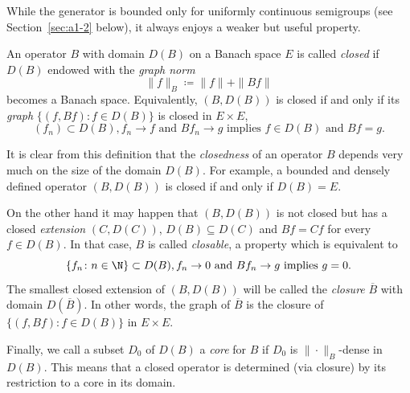 While the generator is bounded only for uniformly continuous semigroups (see Section~\ref{sec:a1-2} below), it always enjoys a weaker but useful property.
\begin{definition}\label{def:a1-1.8}
An operator $B$ with domain $D(B)$ on a Banach space $E$ is called \emph{closed} if\/ $D(B)$ endowed with the \emph{graph norm}
\begin{equation*}\label{eq:a1-1.8}
	\|f\|_{B} \coloneqq \|f\| + \|Bf\|
\end{equation*} 
becomes a Banach space.
Equivalently, $(B,D(B))$ is closed if and only if its \emph{graph} $\{(f,Bf) \colon f \in D(B)\}$ is closed in $E \times E$, \ie
\[
    (f_{n}) \subset D(B), f_{n} \to f \text{ and } Bf_{n} \to g \text{ implies } f \in D(B) \text{ and } Bf = g.
\]
\end{definition}
It is clear from this definition that the \emph{closedness} of an operator $B$ depends very much on the size of the domain $D(B)$.
For example, a bounded and densely defined operator $(B,D(B))$ is closed if and only if\/ $D(B) = E$.

On the other hand it may happen that $(B,D(B))$ is not closed but has a closed \emph{extension} $(C,D(C))$, \ie  $ D(B) \subseteq D(C)$ and $Bf = Cf $ for every $f \in D(B)$.
In that case, $B$ is called \emph{closable}, a property which is equivalent to
\[
    \{f_{n} \colon n \in \N \} \subset D(B), f_{n} \to 0 \text{ and } Bf_{n} \to g \text{ implies } g = 0.
\]
The smallest closed extension of\/ $(B,D(B))$ will be called the \emph{closure} $\overline{B}$ with domain $D(\overline{B})$.
In other words, the graph of\/ $\overline{B}$ is the closure of\/ $\{(f,Bf) \colon f \in D(B)\}$ in $E \times E$.

Finally, we call a subset $D_{0}$ of\/ $D(B)$ a \emph{core} for $B$ if\/ $D_{0}$ is $\|\cdot\|_{B}$-dense in $D(B)$.
This means that a closed operator is determined (via closure) by its restriction to a core in its domain.

